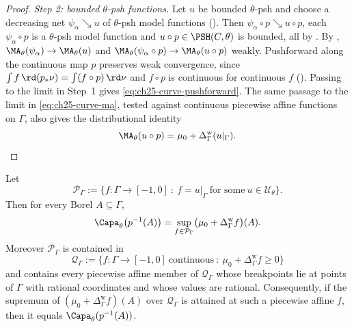 \begin{proof}
\emph{Step 2: bounded $\theta$-psh functions.}  Let $u$ be bounded
$\theta$-psh and choose a decreasing net $\psi_\alpha\searrow u$ of
$\theta$-psh model functions
().  Then
$\psi_\alpha\circ p\searrow u\circ p$, each $\psi_\alpha\circ p$ is a
$\theta$-psh model function and $u\circ p\in\PSH(C,\theta)$ is bounded,
all by .  By
,
$\MA_\theta(\psi_\alpha)\to\MA_\theta(u)$ and
$\MA_\theta(\psi_\alpha\circ p)\to\MA_\theta(u\circ p)$ weakly.  Pushforward
along the continuous map $p$ preserves weak convergence, since
$\int f\,\rd(p_*\nu)=\int(f\circ p)\,\rd\nu$ and $f\circ p$ is continuous
for continuous $f$ ().  Passing to the limit in
Step~1 gives \eqref{eq:ch25-curve-pushforward}.  The same passage to the
limit in \eqref{eq:ch25-curve-ma}, tested against continuous piecewise
affine functions on $\Gamma$, also gives the distributional identity
\[
 \MA_\theta(u\circ p)
 =\mu_0+\Delta^{\mathrm w}_\Gamma(u|_\Gamma).
\]
\end{proof}

\begin{corollary}
\label{cor:ch25-curve-capacity-formula}
Let
\[
 \mathcal P_\Gamma
 :=\bigl\{f:\Gamma\to[-1,0]\ :\ f=u|_\Gamma\ \text{for some}\
   u\in\mathcal U_\theta\bigr\}.
\]
Then for every Borel $A\subseteq\Gamma$,
\begin{equation}
\label{eq:ch25-curve-capacity}
 \Capa_\theta\bigl(p^{-1}(A)\bigr)
 =\sup_{f\in\mathcal P_\Gamma}
     \bigl(\mu_0+\Delta^{\mathrm w}_\Gamma f\bigr)(A).
\end{equation}
Moreover $\mathcal P_\Gamma$ is contained in
\[
 \mathcal Q_\Gamma:=\bigl\{f:\Gamma\to[-1,0]\ \text{continuous}\ :\
    \mu_0+\Delta^{\mathrm w}_\Gamma f\geq0\bigr\}
\]
and contains every piecewise affine member of $\mathcal Q_\Gamma$ whose
breakpoints lie at points of $\Gamma$ with rational coordinates and whose
values are rational.  Consequently, if the supremum of
$(\mu_0+\Delta^{\mathrm w}_\Gamma f)(A)$ over
$\mathcal Q_\Gamma$ is attained at such
a piecewise affine $f$, then it equals
$\Capa_\theta(p^{-1}(A))$.
\end{corollary}

